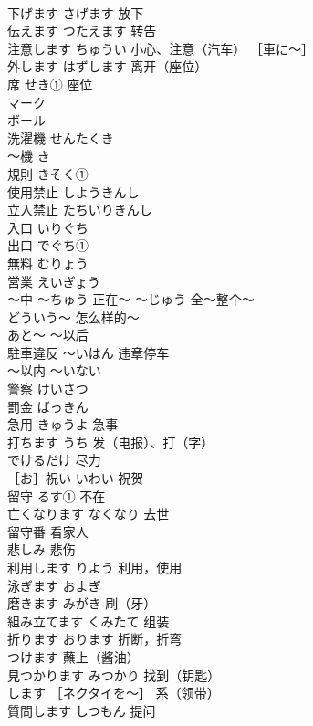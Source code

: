 \documentclass[8pt]{extreport}
\begin{document}
\begin{CJK}{UTF8}{min}
\\	下げます	さげます 放下	
\\	伝えます	つたえます 转告	
\\	注意します	ちゅうい 小心、注意（汽车） ［車に〜］	
\\	外します	はずします 离开（座位）	
\\	席	せき① 座位	
\\	マーク	
\\	ボール	
\\	洗濯機	せんたくき	
\\	〜機	き	
\\	規則	きそく①	
\\	使用禁止	しようきんし	
\\	立入禁止	たちいりきんし	
\\	入口	いりぐち	
\\	出口	でぐち①	
\\	無料	むりょう	
\\	営業	えいぎょう	
\\	〜中	〜ちゅう 正在～ 〜じゅう 全～整个～	
\\	どういう〜	怎么样的～	
\\	あと〜	～以后	
\\	駐車違反	～いはん 违章停车	
\\	～以内	〜いない	
\\	警察	けいさつ	
\\	罰金	ばっきん	
\\	急用	きゅうよ 急事	
\\	打ちます	うち 发（电报）、打（字）	
\\	でけるだけ	尽力	
\\	［お］祝い	いわい 祝贺	
\\	留守	るす① 不在	
\\	亡くなります	なくなり 去世	
\\	留守番	看家人	
\\	悲しみ	悲伤	
\\	利用します	りよう 利用，使用	
\\	泳ぎます	およぎ	
\\	磨きます	みがき 刷（牙）	
\\	組み立てます	くみたて 组装	
\\	折ります	おります 折断，折弯	
\\	つけます	蘸上（酱油）	
\\	見つかります	みつかり 找到（钥匙）	
\\	します ［ネクタイを〜］	系（领带）	
\\	質問します	しつもん 提问	

\end{CJK}
\end{document}
